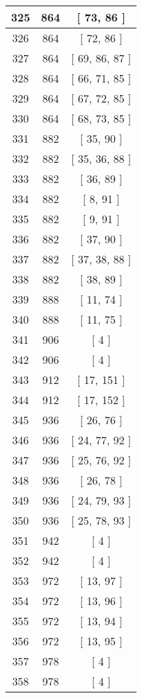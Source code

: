 \begin{center}
\begin{longtable}[H]{|| c c c ||}
\hline
325 & 864 & [ 73, 86 ] \\ 
\hline
326 & 864 & [ 72, 86 ] \\ 
\hline
327 & 864 & [ 69, 86, 87 ] \\ 
\hline
328 & 864 & [ 66, 71, 85 ] \\ 
\hline
329 & 864 & [ 67, 72, 85 ] \\ 
\hline
330 & 864 & [ 68, 73, 85 ] \\ 
\hline
331 & 882 & [ 35, 90 ] \\ 
\hline
332 & 882 & [ 35, 36, 88 ] \\ 
\hline
333 & 882 & [ 36, 89 ] \\ 
\hline
334 & 882 & [ 8, 91 ] \\ 
\hline
335 & 882 & [ 9, 91 ] \\ 
\hline
336 & 882 & [ 37, 90 ] \\ 
\hline
337 & 882 & [ 37, 38, 88 ] \\ 
\hline
338 & 882 & [ 38, 89 ] \\ 
\hline
339 & 888 & [ 11, 74 ] \\ 
\hline
340 & 888 & [ 11, 75 ] \\ 
\hline
341 & 906 & [ 4 ] \\ 
\hline
342 & 906 & [ 4 ] \\ 
\hline
343 & 912 & [ 17, 151 ] \\ 
\hline
344 & 912 & [ 17, 152 ] \\ 
\hline
345 & 936 & [ 26, 76 ] \\ 
\hline
346 & 936 & [ 24, 77, 92 ] \\ 
\hline
347 & 936 & [ 25, 76, 92 ] \\ 
\hline
348 & 936 & [ 26, 78 ] \\ 
\hline
349 & 936 & [ 24, 79, 93 ] \\ 
\hline
350 & 936 & [ 25, 78, 93 ] \\ 
\hline
351 & 942 & [ 4 ] \\ 
\hline
352 & 942 & [ 4 ] \\ 
\hline
353 & 972 & [ 13, 97 ] \\ 
\hline
354 & 972 & [ 13, 96 ] \\ 
\hline
355 & 972 & [ 13, 94 ] \\ 
\hline
356 & 972 & [ 13, 95 ] \\ 
\hline
357 & 978 & [ 4 ] \\ 
\hline
358 & 978 & [ 4 ] \\ 
\hline
\end{longtable}
\end{center}
